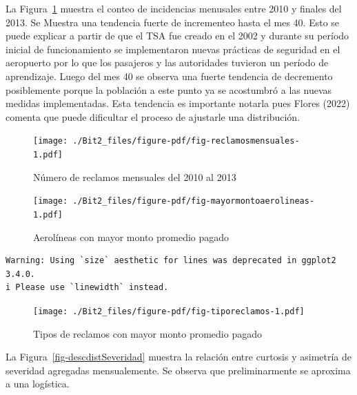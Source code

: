 \documentclass[
  letterpaper,
  onepage,
  openany]{scrreprt}
\begin{document}
La Figura~\ref{fig-reclamosmensuales} muestra el conteo de incidencias
menusales entre 2010 y finales del 2013. Se Muestra una tendencia fuerte
de incrementeo hasta el mes 40. Esto se puede explicar a partir de que
el TSA fue creado en el 2002 y durante su período inicial de
funcionamiento se implementaron nuevas prácticas de seguridad en el
aeropuerto por lo que los pasajeros y las autoridades tuvieron un
período de aprendizaje. Luego del mes 40 se observa una fuerte tendencia
de decremento posiblemente porque la población a este punto ya se
acostumbró a las nuevas medidas implementadas. Esta tendencia es
importante notarla pues Flores (2022) comenta que puede dificultar el
proceso de ajustarle una distribución.

\begin{figure}[H]

\caption{\label{fig-reclamosmensuales}Número de reclamos mensuales del
2010 al 2013}

{\centering \texttt{[image: ./Bit2\_files/figure-pdf/fig-reclamosmensuales-1.pdf]}

}

\end{figure}

\begin{figure}[H]

\caption{\label{fig-mayormontoaerolineas}Aerolíneas con mayor monto
promedio pagado}

{\centering \texttt{[image: ./Bit2\_files/figure-pdf/fig-mayormontoaerolineas-1.pdf]}

}

\end{figure}

\begin{verbatim}
Warning: Using `size` aesthetic for lines was deprecated in ggplot2 3.4.0.
i Please use `linewidth` instead.
\end{verbatim}

\begin{figure}[H]

\caption{\label{fig-tiporeclamos}Tipos de reclamos con mayor monto
promedio pagado}

{\centering \texttt{[image: ./Bit2\_files/figure-pdf/fig-tiporeclamos-1.pdf]}

}

\end{figure}

La Figura~\ref{fig-descdistSeveridad} muestra la relación entre curtosis
y asimetría de severidad agregadas mensualemente. Se observa que
preliminarmente se aproxima a una logística.
\end{document}
